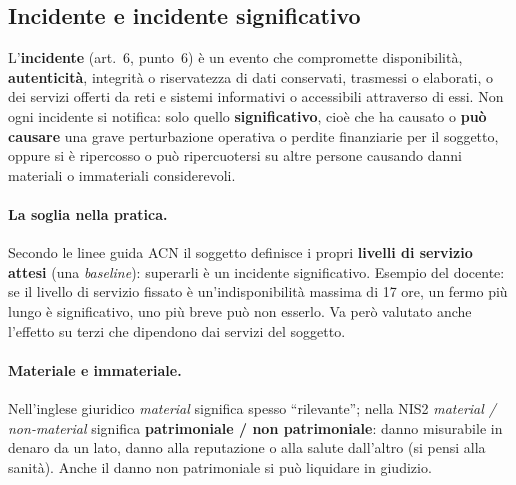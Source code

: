 \subsection{Incidente e incidente significativo}
L'\textbf{incidente} (art.~6, punto~6) è un evento che compromette disponibilità, \textbf{autenticità},
integrità o riservatezza di dati conservati, trasmessi o elaborati, o dei servizi offerti da reti e
sistemi informativi o accessibili attraverso di essi. Non ogni incidente si notifica: solo quello
\textbf{significativo}, cioè che ha causato o \textbf{può causare} una grave perturbazione operativa o
perdite finanziarie per il soggetto, oppure si è ripercosso o può ripercuotersi su altre persone
causando danni materiali o immateriali considerevoli.

\paragraph{La soglia nella pratica.} Secondo le linee guida ACN il soggetto definisce i propri
\textbf{livelli di servizio attesi} (una \emph{baseline}): superarli è un incidente significativo.
Esempio del docente: se il livello di servizio fissato è un'indisponibilità massima di 17 ore, un fermo
più lungo è significativo, uno più breve può non esserlo. Va però valutato anche l'effetto su terzi che
dipendono dai servizi del soggetto.

\paragraph{Materiale e immateriale.} Nell'inglese giuridico \emph{material} significa spesso
``rilevante''; nella NIS2 \emph{material / non-material} significa \textbf{patrimoniale / non
patrimoniale}: danno misurabile in denaro da un lato, danno alla reputazione o alla salute dall'altro
(si pensi alla sanità). Anche il danno non patrimoniale si può liquidare in giudizio.

